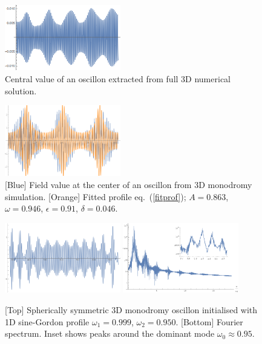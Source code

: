 \documentclass[%
reprint,
superscriptaddress,
amsmath,amssymb,
aps,
prd,
floatfix,
nofootinbib
]{revtex4-1}
\begin{document}
\begin{figure}
  \centering
  \includegraphics[width=0.45\textwidth]{plot/3Doscillon.png} 
    \caption{Central value of an oscillon extracted from full 3D numerical solution.}
  \label{raw}
\end{figure}

\begin{figure}
  \centering
  \includegraphics[width=0.45\textwidth]{plot/simul-profile.png}
  \caption{[Blue] Field value at the center of an oscillon from 3D monodromy simulation. [Orange] Fitted profile eq.~(\ref{fitprof}); $A=0.863$, $\omega=0.946$, $\epsilon=0.91$,  $\delta=0.046$.}\label{simul-prof}
\end{figure}

\begin{figure}
  \centering
  \includegraphics[width=0.45\textwidth]{plot/profile-3scale.png}
  \includegraphics[width=0.45\textwidth]{plot/fourier.png}
  \caption{[Top] Spherically symmetric 3D monodromy oscillon initialised with 1D
    sine-Gordon profile $\omega_1=0.999$, $\omega_2=0.950$.  [Bottom] Fourier spectrum. Inset shows  peaks around the dominant mode $\omega_0\approx0.95$.}\label{fourier}
\end{figure}
 
\end{document}
